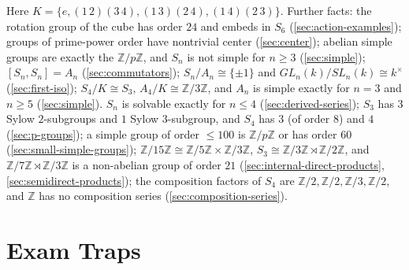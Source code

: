 \documentclass[11pt]{report}
\begin{document}
Here $K = \{e, (1\,2)(3\,4), (1\,3)(2\,4), (1\,4)(2\,3)\}$. Further facts: the rotation group of the cube has order $24$ and embeds in $S_6$ (\ref{sec:action-examples}); groups of prime-power order have nontrivial center (\ref{sec:center}); abelian simple groups are exactly the $\mathbb{Z}/p\mathbb{Z}$, and $S_n$ is not simple for $n \geq 3$ (\ref{sec:simple}); $[S_n, S_n] = A_n$ (\ref{sec:commutators}); $S_n/A_n \cong \{\pm 1\}$ and $GL_n(k)/SL_n(k) \cong k^\times$ (\ref{sec:first-iso}); $S_4/K \cong S_3$, $A_4/K \cong \mathbb{Z}/3\mathbb{Z}$, and $A_n$ is simple exactly for $n = 3$ and $n \geq 5$ (\ref{sec:simple}). $S_n$ is solvable exactly for $n \leq 4$ (\ref{sec:derived-series}); $S_3$ has $3$ Sylow $2$-subgroups and $1$ Sylow $3$-subgroup, and $S_4$ has $3$ (of order $8$) and $4$ (\ref{sec:p-groups}); a simple group of order $\leq 100$ is $\mathbb{Z}/p\mathbb{Z}$ or has order $60$ (\ref{sec:small-simple-groups}); $\mathbb{Z}/15\mathbb{Z} \cong \mathbb{Z}/5\mathbb{Z} \times \mathbb{Z}/3\mathbb{Z}$, $S_3 \cong \mathbb{Z}/3\mathbb{Z} \rtimes \mathbb{Z}/2\mathbb{Z}$, and $\mathbb{Z}/7\mathbb{Z} \rtimes \mathbb{Z}/3\mathbb{Z}$ is a non-abelian group of order $21$ (\ref{sec:internal-direct-products}, \ref{sec:semidirect-products}); the composition factors of $S_4$ are $\mathbb{Z}/2, \mathbb{Z}/2, \mathbb{Z}/3, \mathbb{Z}/2$, and $\mathbb{Z}$ has no composition series (\ref{sec:composition-series}).

\section*{Exam Traps}
{}\label{sec:traps}
\end{document}
